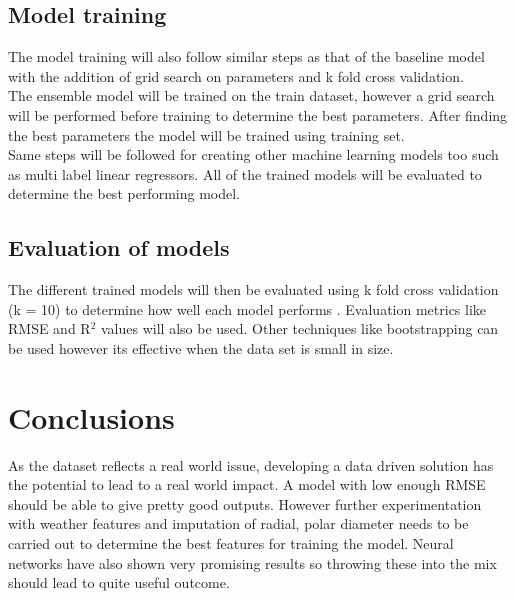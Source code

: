 \documentclass{article}
\begin{document}
\subsection{Model training}
The model training will also follow similar steps as that of the baseline model with the addition of grid search on parameters and k fold cross validation.\\
The ensemble model will be trained on the train dataset, however a grid search will be performed before training to determine the best parameters. After finding the best parameters the model will be trained using training set.\\
Same steps will be followed for creating other machine learning models too such as multi label linear regressors. All of the trained models will be evaluated to determine the best performing model.

\subsection{Evaluation of models}
The different trained models will then be evaluated using k fold cross validation (k = 10) to determine how well each model performs \cite{rodriguez2009sensitivity}. Evaluation metrics like RMSE and R$^2$ values will also be used.  Other techniques like bootstrapping can be used however its effective when the data set is small in size.

\section{Conclusions}
As the dataset reflects a real world issue, developing a data driven solution has the potential to lead to a real world impact. A model with low enough RMSE should be able to give pretty good outputs. However further experimentation with weather features and imputation of radial, polar diameter needs to be carried out to determine the best features for training the model. Neural networks have also shown very promising results \cite{bhojani2020wheat} so throwing these into the mix should lead to quite useful outcome.







\end{document}
